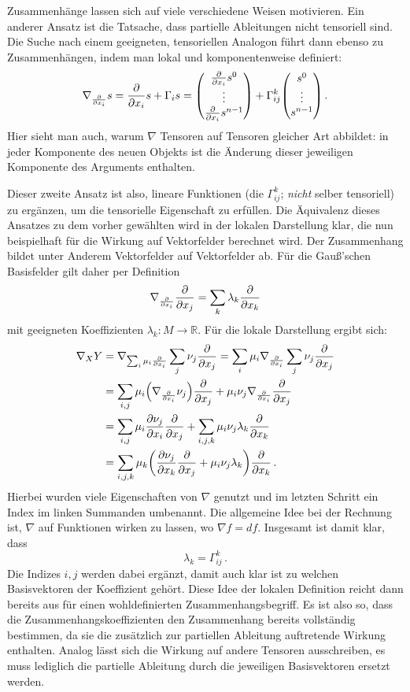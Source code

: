 \documentclass[../H_Analysis_main.tex]{subfiles}
\begin{document}
Zusammenhänge lassen sich auf viele verschiedene Weisen motivieren. Ein anderer Ansatz ist die Tatsache, dass partielle Ableitungen nicht tensoriell sind. Die Suche nach einem geeigneten, tensoriellen Analogon führt dann ebenso zu Zusammenhängen, indem man lokal und komponentenweise definiert:
\begin{equation}
\nabla_{\pdv{x_i}} s = \pdv{x_i} s + \Gamma_i s = \mqty(\pdv{x_i} s^0 \\ \vdots \\ \pdv{x_i} s^{n - 1}) + \Gamma_{ij}^k \mqty(s^0 \\ \vdots \\ s^{n - 1}) \, .
\end{equation}
Hier sieht man auch, warum $\nabla$ Tensoren auf Tensoren gleicher Art abbildet: in jeder Komponente des neuen Objekts ist die Änderung dieser jeweiligen Komponente des Arguments enthalten.

Dieser zweite Ansatz ist also, lineare Funktionen (die  $\Gamma_{ij}^k$; \emph{nicht} selber tensoriell) zu ergänzen, um die tensorielle Eigenschaft zu erfüllen. Die Äquivalenz dieses Ansatzes zu dem vorher gewählten wird in der lokalen Darstellung klar, die nun beispielhaft für die Wirkung auf Vektorfelder berechnet wird. Der Zusammenhang bildet unter Anderem Vektorfelder auf Vektorfelder ab. Für die Gauß'schen Basisfelder gilt daher per Definition
\begin{equation}
\nabla_{\pdv{x_i}} \pdv{x_j} = \sum_k \lambda_k \pdv{x_k}
\end{equation}
mit geeigneten Koeffizienten $\lambda_k: M \rightarrow \mathbb{R}$. Für die lokale Darstellung ergibt sich:
\begin{align}
\nabla_X Y &= \nabla_{\sum_i \mu_i \pdv{x_i}} \sum_j \nu_j \pdv{x_j} = \sum_i \mu_i \nabla_{\pdv{x_i}} \sum_j \nu_j \pdv{x_j}
\notag\\
&= \sum_{i, j} \mu_i \qty(\nabla_{\pdv{x_i}} \nu_j) \pdv{x_j} + \mu_i \nu_j \nabla_{\pdv{x_i}} \pdv{x_j}
\notag\\
&= \sum_{i, j} \mu_i \pdv{\nu_j}{x_i} \pdv{x_j} + \sum_{i, j, k} \mu_i \nu_j \lambda_k \pdv{x_k}
\notag\\
&= \sum_{i, j, k} \mu_k \qty(\pdv{\nu_j}{x_k} \pdv{x_j} + \mu_i \nu_j \lambda_k) \pdv{x_k} \, .
\end{align}
Hierbei wurden viele Eigenschaften von $\nabla$ genutzt und im letzten Schritt ein Index im linken Summanden umbenannt. Die allgemeine Idee bei der Rechnung ist, $\nabla$ auf Funktionen wirken zu lassen, wo $\nabla f = df$. Insgesamt ist damit klar, dass
\begin{equation}
\lambda_k = \Gamma_{ij}^k \, .
\end{equation}
Die Indizes $i, j$ werden dabei ergänzt, damit auch klar ist zu welchen Basisvektoren der Koeffizient gehört. Diese Idee der lokalen Definition reicht dann bereits aus für einen wohldefinierten Zusammenhangsbegriff. Es ist also so, dass die Zusammenhangskoeffizienten den Zusammenhang bereits vollständig bestimmen, da sie die zusätzlich zur partiellen Ableitung auftretende Wirkung enthalten. Analog lässt sich die Wirkung auf andere Tensoren ausschreiben, es muss lediglich die partielle Ableitung durch die jeweiligen Basisvektoren ersetzt werden.
\end{document}
